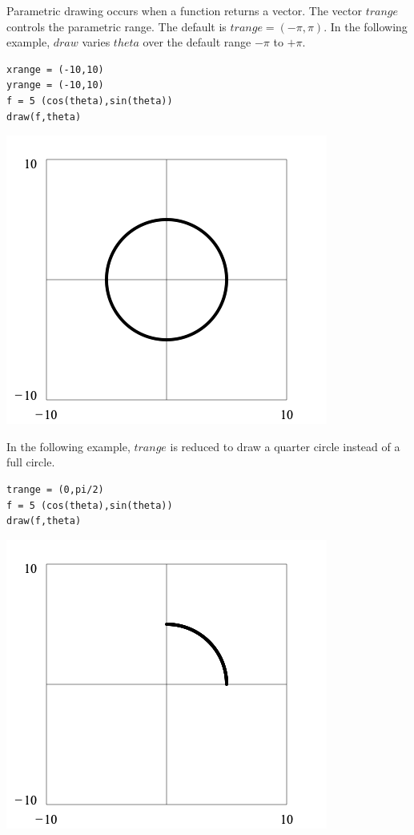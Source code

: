 \noindent
Parametric drawing occurs when a function returns a vector.
The vector $trange$ controls the parametric range.
The default is $trange=(-\pi,\pi)$.
In the following example, $draw$ varies $theta$
over the default range $-\pi$ to $+\pi$.

{\color{blue}
\begin{verbatim}
xrange = (-10,10)
yrange = (-10,10)
f = 5 (cos(theta),sin(theta))
draw(f,theta)
\end{verbatim}
}

\begin{center}
\includegraphics[scale=0.5]{circle1.png}
\end{center}

\noindent
In the following example, $trange$ is reduced
to draw a quarter circle instead of a full circle.

{\color{blue}
\begin{verbatim}
trange = (0,pi/2)
f = 5 (cos(theta),sin(theta))
draw(f,theta)
\end{verbatim}
}

\begin{center}
\includegraphics[scale=0.5]{circle2.png}
\end{center}

